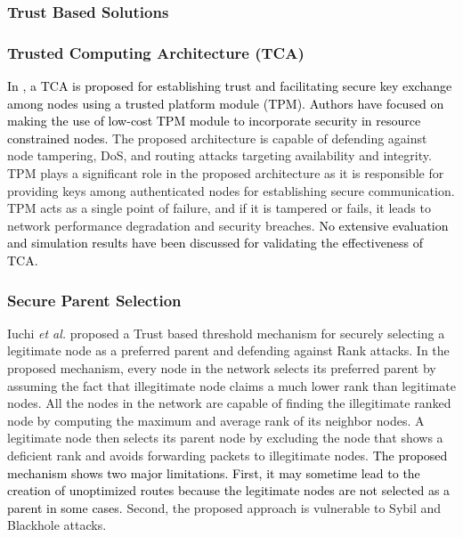 \documentclass[10pt,journal,sort & compress]{IEEEtran}
\begin{document}
\subsubsection{Trust Based Solutions}

\subsubsection*{Trusted Computing Architecture (TCA)}

\textcolor{black}{In \cite{seeber2013towards}, a  TCA is proposed for establishing trust and facilitating secure key exchange among nodes using a trusted platform module (TPM).} \textcolor{black}{Authors have focused on making the use of low-cost TPM module to incorporate security in resource constrained nodes.} The proposed architecture is capable of defending against node tampering, DoS, and routing attacks targeting availability and integrity. TPM plays a significant role in the proposed architecture as it is responsible for providing keys among authenticated nodes for establishing secure communication. TPM acts as a single point of failure, and if it is tampered or fails, it leads to network performance degradation and security breaches. \textcolor{black}{No extensive evaluation and simulation results have been discussed for validating the effectiveness of TCA.} 


\subsubsection*{Secure Parent Selection}
Iuchi \textit{et al.} \cite{iuchi2015secure} proposed a Trust based threshold mechanism for securely selecting a legitimate node as a preferred parent and defending against Rank attacks. In the proposed mechanism, every node in the network selects its preferred parent by assuming the fact that illegitimate node claims a much lower rank than legitimate nodes. All the nodes in the network are capable of finding the illegitimate ranked node by computing the maximum and average rank of its neighbor nodes. A legitimate node then selects its parent node by excluding the node that shows a deficient rank and avoids forwarding packets to illegitimate nodes. \textcolor{black}{The proposed mechanism shows two major limitations. First, it may sometime lead to the creation of unoptimized routes because the legitimate nodes are not selected as a parent in some cases.} Second, the proposed approach is vulnerable to Sybil and Blackhole attacks.
\end{document}

